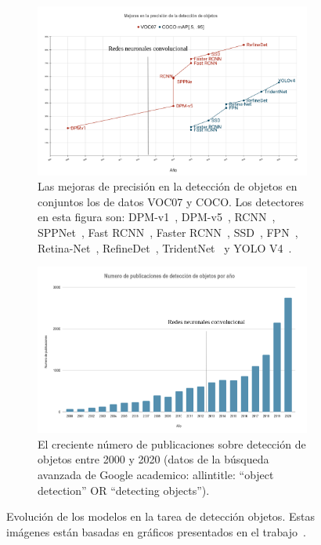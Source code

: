 \begin{figure}[H]
	\centering
	\begin{subfigure}{0.75\textwidth}
		\centering
		\includegraphics[width=1\textwidth]{img/evolucion_2.png}
		\caption{Las mejoras de precisión en la detección de objetos en conjuntos los de datos VOC07 y COCO. Los detectores en esta figura son: DPM-v1~\cite{felzenszwalb2008discriminatively}, DPM-v5~\cite{sadeghi201430hz}, RCNN~\cite{girshick2014rich}, SPPNet~\cite{girshick2014rich}, Fast RCNN~\cite{he2015spatial}, Faster RCNN~\cite{ren2015faster}, SSD~\cite{liu2016ssd}, FPN~\cite{lin2017feature}, Retina-Net~\cite{lin2017focal}, RefineDet~\cite{zhang2018single}, TridentNet~\cite{li2019scale} y YOLO V4~\cite{wang2020scaled}.}
		\label{fig:IoU}
	\end{subfigure}
	\centering
	\begin{subfigure}{0.75\textwidth}
		\centering
		\includegraphics[width=1\textwidth]{img/evolucion_1.png}
		\caption{El creciente número de publicaciones sobre detección de objetos entre 2000 y 2020 (datos de la búsqueda avanzada de Google academico: allintitle: ``object detection'' OR ``detecting objects'').}
		\label{fig:NMS}
	\end{subfigure}
	\caption{Evolución de los modelos en la tarea de detección objetos. Estas imágenes están basadas en gráficos presentados en el trabajo~\cite{zou2019object}.}
	\label{fig:evolucion}
\end{figure}


